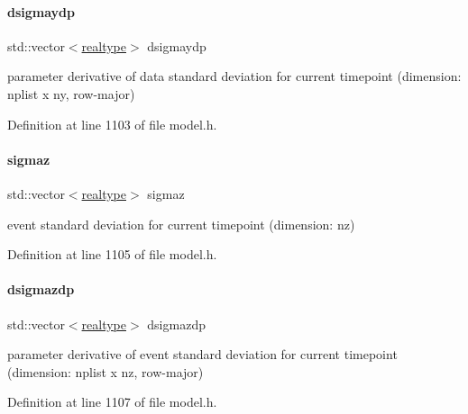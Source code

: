 \mbox{\label{classamici_1_1_model_ac27fda47fffca46aa720e7df432edab4}} 
\paragraph{\texorpdfstring{dsigmaydp}{dsigmaydp}}
{\footnotesize\ttfamily std\+::vector$<$\mbox{\hyperlink{namespaceamici_a1bdce28051d6a53868f7ccbf5f2c14a3}{realtype}}$>$ dsigmaydp}

parameter derivative of data standard deviation for current timepoint (dimension\+: nplist x ny, row-\/major) 

Definition at line 1103 of file model.\+h.

\mbox{\label{classamici_1_1_model_adc3c5ee1620b079cd34137010873f500}} 
\paragraph{\texorpdfstring{sigmaz}{sigmaz}}
{\footnotesize\ttfamily std\+::vector$<$\mbox{\hyperlink{namespaceamici_a1bdce28051d6a53868f7ccbf5f2c14a3}{realtype}}$>$ sigmaz}

event standard deviation for current timepoint (dimension\+: nz) 

Definition at line 1105 of file model.\+h.

\mbox{\label{classamici_1_1_model_aae09fc37aa5eb7b2ba0e9bb335940fd5}} 
\paragraph{\texorpdfstring{dsigmazdp}{dsigmazdp}}
{\footnotesize\ttfamily std\+::vector$<$\mbox{\hyperlink{namespaceamici_a1bdce28051d6a53868f7ccbf5f2c14a3}{realtype}}$>$ dsigmazdp}

parameter derivative of event standard deviation for current timepoint (dimension\+: nplist x nz, row-\/major) 

Definition at line 1107 of file model.\+h.

